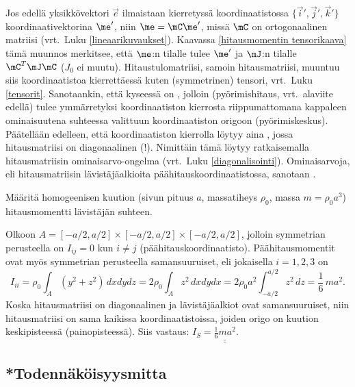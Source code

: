 Jos edellä yksikkövektori $\vec e$ ilmaistaan kierretyssä koordinaatistossa 
$\{\vec i',\vec j', \vec k'\}$ koordinaativektorina $\me'$, niin $\me=\mC\me'$, missä $\mC$ on
ortogonaalinen matriisi (vrt.\ Luku \ref{lineaarikuvaukset}). Kaavassa
\eqref{hitausmomentin tensorikaava} tämä muunnos merkitsee, että $\me$:n tilalle tulee
$\me'$ ja $\mJ$:n tilalle $\mC^T\mJ\mC$ ($J_0$ ei muutu). Hitaustulomatriisi, samoin
hitausmatriisi, muuntuu siis koordinaatistoa kierrettäessä kuten (symmetrinen) tensori,
vrt.\ Luku \ref{tensorit}. Sanotaankin, että kyseessä on , jolloin
 (pyörimishitaus, vrt.\ alaviite edellä) tulee ymmärretyksi koordinaatiston
kierrosta riippumattomana kappaleen ominaisuutena suhteessa valittuun koordinaatiston origoon
(pyörimiskeskus). Päätellään edelleen, että koordinaatiston kierrolla löytyy
aina , jossa hitausmatriisi on diagonaalinen (!). Nimittäin tämä
löytyy ratkaisemalla hitausmatriisin ominaisarvo-ongelma (vrt.\ Luku \ref{diagonalisointi}).
Ominaisarvoja, eli hitausmatriisin
%
lävistäjäalkioita päähitauskoordinaatistossa, sanotaan .
\begin{Exa} Määritä homogeenisen kuution (sivun pituus $a$, massatiheys $\rho_0$, massa 
$m=\rho_0 a^3$) hitausmomentti lävistäjän suhteen.
\end{Exa}
\ratk Olkoon $A=[-a/2,a/2]\times[-a/2,a/2]\times[-a/2,a/2]$, jolloin symmetrian perusteella on
$I_{ij}=0$ kun $i \neq j$ (päähitauskoordinaatisto). Päähitausmomentit ovat myös symmetrian 
perusteella samansuuruiset, eli jokaisella $i=1,2,3$ on
\[
I_{ii} = \rho_0\int_A (y^2+z^2)\,dxdydz = 2\rho_0\int_A z^2\,dxdydx 
       = 2\rho_0 a^2\int_{-a/2}^{a/2} z^2\,dz = \frac{1}{6}\,ma^2.
\]
Koska hitausmatriisi on diagonaalinen ja lävistäjäalkiot ovat samansuuruiset, niin 
hitausmatriisi on sama kaikissa koordinaatistoissa, joiden origo on kuution
keskipisteessä (painopisteessä). Siis vastaus: $I_S=\underline{\underline{\frac{1}{6}ma^2}}$.
\loppu

\subsection{*Todennäköisyysmitta}

